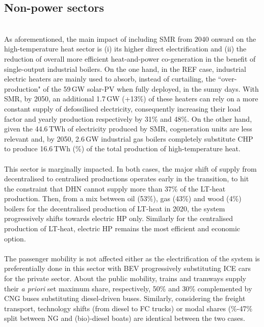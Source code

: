 \subsection{Non-power sectors}
\label{subsec:atom_mol:results_deter_others}

\\

As aforementioned, the main impact of including \gls{SMR} from 2040 onward on the high-temperature heat sector is (i) its higher direct electrification and (ii) the reduction of overall more efficient heat-and-power co-generation in the benefit of single-output industrial boilers. On the one hand, in the REF case, industrial electric heaters are mainly used to absorb, instead of curtailing, the ``over-production" of the 59\,GW solar-PV when fully deployed, in the sunny days. With \gls{SMR}, by 2050, an additional 1.7\,GW (+13\%) of these heaters can rely on a more constant supply of defossilised electricity, consequently increasing their load factor and yearly production respectively by 31\% and 48\%. On the other hand, given the 44.6\,TWh of electricity produced by \gls{SMR}, cogeneration units are less relevant and, by 2050, 2.6\,GW industrial gas boilers completely substitute \gls{CHP} to produce 16.6\,TWh (\%) of the total production of high-temperature heat.\\

\\

This sector is marginally impacted. In both cases, the major shift of supply from decentralised to centralised productions operates early in the transition, to hit the constraint that \gls{DHN} cannot supply more than 37\% of the \gls{LT}-heat production. Then, from a mix between oil (53\%), gas (43\%) and wood (4\%) boilers for the decentralised production of \gls{LT}-heat in 2020, the system progressively shifts towards electric \gls{HP} only. Similarly for the centralised production of \gls{LT}-heat, electric \gls{HP} remains the most efficient and economic option.\\

\\

The passenger mobility is not affected either as the electrification of the system is preferentially done in this sector with \gls{BEV} progressively substituting \gls{ICE} cars for the private sector. About the public mobility, trains and tramways supply their \textit{a priori} set maximum share, respectively, 50\% and 30\% complemented by \gls{CNG} buses substituting diesel-driven buses. Similarly, considering the freight transport, technology shifts (\ie from diesel to \gls{FC} trucks) or modal shares (\%-47\% split between \gls{NG} and (bio)-diesel boats) are identical between the two cases.\\

